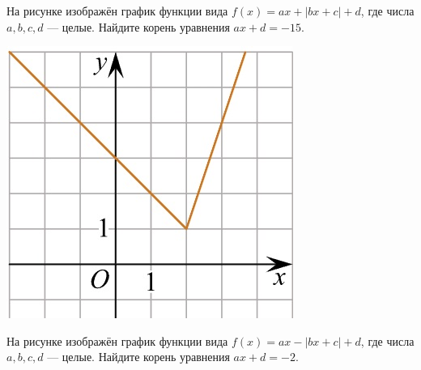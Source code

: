 %	
%
%
\begin{class}[number=6]
	\begin{listofex}
		\item
		\begin{minipage}[t]{0.43\textwidth}
			На рисунке изображён график функции вида \(f(x)=ax+|bx+c|+d\), где числа \(a, b, c, d\) --- целые. Найдите корень уравнения \(ax+d=-15\).
		\end{minipage}
		\begin{minipage}[c]{0.1\textwidth}
			\includegraphics[align=t, width=\textwidth]{pics/G101M4C5-7.jpg}
		\end{minipage}
		\item
		\begin{minipage}[t]{0.43\textwidth}
			На рисунке изображён график функции вида \(f(x)=ax-|bx+c|+d\), где числа \(a, b, c, d\) --- целые. Найдите корень уравнения \(ax+d=-2\).
		\end{minipage}
		\begin{minipage}[c]{0.1\textwidth}

\end{minipage}
\end{listofex}
\end{class}

